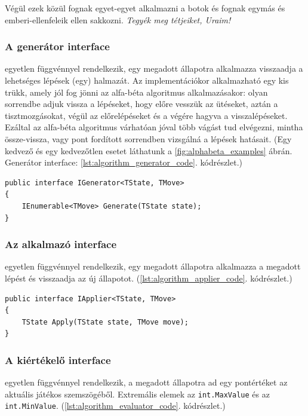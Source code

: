 \documentclass[twoside, a4paper, 12pt]{article}
\begin{document}
Végül ezek közül fognak egyet-egyet alkalmazni a botok és fognak egymás és emberi-ellenfeleik ellen sakkozni. \textit{Tegyék meg tétjeiket, Uraim!}

\subsubsection{A generátor interface} egyetlen függvénnyel rendelkezik, egy megadott állapotra alkalmazza visszaadja a lehetséges lépések (egy) halmazát. Az implementációkor alkalmazható egy kis trükk, amely jól fog jönni az alfa-béta algoritmus alkalmazásakor: olyan sorrendbe adjuk vissza a lépéseket, hogy előre vesszük az ütéseket, aztán a tisztmozgásokat, végül az előrelépéseket és a végére hagyva a visszalépéseket. Ezáltal az alfa-béta algoritmus várhatóan jóval több vágást tud elvégezni, mintha össze-vissza, vagy pont fordított sorrendben vizsgálná a lépések hatásait. (Egy kedvező és egy kedvezőtlen esetet láthatunk a \ref{fig:alphabeta_examples} ábrán. Generátor interface: \ref{lst:algorithm_generator_code}. kódrészlet.)

\begin{lstlisting}[caption=A generátor interface, label=lst:algorithm_generator_code]
public interface IGenerator<TState, TMove>
{
	IEnumerable<TMove> Generate(TState state);
}
\end{lstlisting}


\subsubsection{Az alkalmazó interface} egyetlen függvénnyel rendelkezik, egy megadott állapotra alkalmazza a megadott lépést és visszaadja az új állapotot. (\ref{lst:algorithm_applier_code}. kódrészlet.)

\begin{lstlisting}[caption=Az alkalmazó interface, label=lst:algorithm_applier_code]
public interface IApplier<TState, TMove>
{
	TState Apply(TState state, TMove move);
}
\end{lstlisting}

\subsubsection{A kiértékelő interface} egyetlen függvénnyel rendelkezik, a megadott állapotra ad egy pontértéket az aktuális játékos szemszögéből. Extremális elemek az \texttt{int.MaxValue} és az \texttt{int.MinValue}. (\ref{lst:algorithm_evaluator_code}. kódrészlet.)
\end{document}
